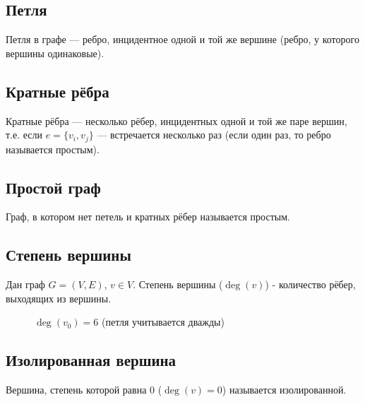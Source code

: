 \documentclass[a4paper,12pt]{article} %
\begin{document}
    \subsection{Петля}
    Петля в графе --- ребро, инцидентное одной и той же вершине (ребро, у которого вершины одинаковые).
    
    \subsection{Кратные рёбра}
    Кратные рёбра --- несколько рёбер, инцидентных одной и той же паре вершин, т.е. если $e = \{ v_i, v_j \}$ --- встречается несколько раз
    (если один раз, то ребро называется простым).
    
    \subsection{Простой граф}
    Граф, в котором нет петель и кратных рёбер называется простым.

    \subsection{Степень вершины}
    \begin{multicols}{2}
          Дан граф $G = (V, E)$, $v \in V$. Степень вершины ($\deg(v)$) - количество рёбер, выходящих из вершины.
          \begin{figure}[H]
              \vspace*{-20pt}
              \centering
              \caption*{$\deg(v_0) = 6$ (петля учитывается дважды)}
            \end{figure}
    \end{multicols}
    
    \subsection{Изолированная вершина}
    Вершина, степень которой равна $0$ ($\deg(v) = 0$) называется изолированной.
    
\end{document}
